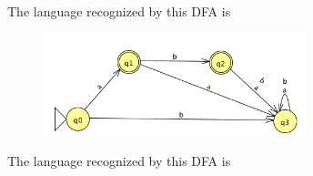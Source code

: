     
    
    The language recognized by this DFA is
    
    
    
    \begin{figure}[h]
       \centering
       \includegraphics[width=3in]{../../resources/machines/Lect2DFA3.png} 
    \end{figure}
    
    
    The language recognized by this DFA is
    
    

